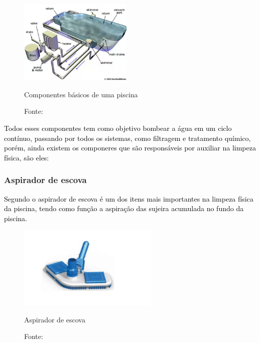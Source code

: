         \begin{figure}[H]
         	\centering
         	\caption{ }  
        	\centering
         	\label{fig:cont}
        	\includegraphics[width=0.48\textwidth]{imagens/componentesPiscina.png}
            \caption*{Componentes básicos de uma piscina}
        	\caption*{Fonte: \cite{refComponents}}
         \end{figure}

        \textcolor{black}{Todos esses componentes tem como objetivo bombear a água em um ciclo contínuo, passando por todos os sistemas, como filtragem e tratamento químico, porém, ainda existem os componeres que são responsáveis por auxiliar na limpeza física, são eles:}

        \subsubsection*{Aspirador de escova}

         \textcolor{black}{Segundo \cite{benedito2024projeto} o aspirador de escova é um dos itens mais importantes na limpeza física da piscina, tendo como função a aspiração das sujeira acumulada no fundo da piscina.}

            \begin{figure}[H]
                \centering
                \caption{ }  
                \centering
                \label{fig:cont}
                \includegraphics[width=0.60\textwidth]{imagens/aspirador.png}
                \caption*{Aspirador de escova}
                \caption*{Fonte: \cite{benedito2024projeto}}
            \end{figure}

